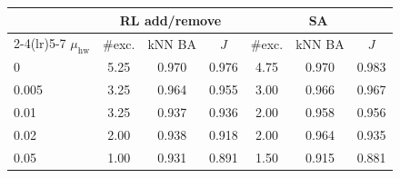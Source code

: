 {\small
\setlength{\tabcolsep}{4pt}
\begin{tabular}{lcccccc}
\toprule
 & \multicolumn{3}{c}{RL add/remove} & \multicolumn{3}{c}{SA} \\
\cmidrule(lr){2-4}\cmidrule(lr){5-7}
$\mu_{\mathrm{hw}}$ & \#exc. & kNN BA & $J$ & \#exc. & kNN BA & $J$ \\
\midrule
0 & 5.25 & 0.970 & 0.976 & 4.75 & 0.970 & 0.983 \\
0.005 & 3.25 & 0.964 & 0.955 & 3.00 & 0.966 & 0.967 \\
0.01 & 3.25 & 0.937 & 0.936 & 2.00 & 0.958 & 0.956 \\
0.02 & 2.00 & 0.938 & 0.918 & 2.00 & 0.964 & 0.935 \\
0.05 & 1.00 & 0.931 & 0.891 & 1.50 & 0.915 & 0.881 \\
\bottomrule
\end{tabular}
}
